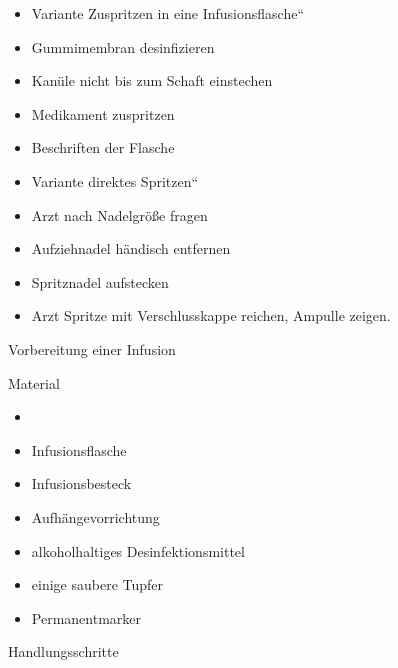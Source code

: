 \documentclass{article}
\begin{document}
\begin{itemize}
\item Variante {\quotedblbase}Zuspritzen in eine
Infusionsflasche{\textquotedblleft}

\end{itemize}
\begin{itemize}
\item Gummimembran desinfizieren

\item Kan\"ule nicht bis zum Schaft einstechen

\item Medikament zuspritzen

\item Beschriften der Flasche

\end{itemize}
\begin{itemize}
\item Variante {\quotedblbase}direktes Spritzen{\textquotedblleft}

\end{itemize}
\begin{itemize}
\item Arzt nach Nadelgr\"o{\ss}e fragen

\item Aufziehnadel h\"andisch entfernen

\item Spritznadel aufstecken

\item Arzt Spritze mit Verschlusskappe reichen, Ampulle zeigen.

\end{itemize}
Vorbereitung einer Infusion

Material

\begin{itemize}
\item \item Infusionsflasche

\item Infusionsbesteck

\item Aufh\"angevorrichtung

\item alkoholhaltiges Desinfektionsmittel

\item einige saubere Tupfer

\item Permanentmarker

\end{itemize}
Handlungsschritte
\end{document}
